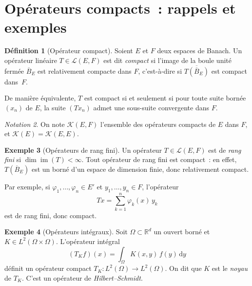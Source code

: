 \documentclass[a4paper,12pt]{book}
\DeclareMathOperator{\im}{im}
\newcommand{\R}{\mathbb{R}}
\newcommand{\dd}{\mathrm{d}}
\theoremstyle{definition}
\newtheorem{definition}{Définition}[chapter]
\newtheorem{exemple}[definition]{Exemple}
\theoremstyle{plain}
\theoremstyle{remark}
\newtheorem{notation}[definition]{Notation}
\begin{document}
\section{Opérateurs compacts~: rappels et exemples}

\begin{definition}[Opérateur compact]
\label{def:op-compact}
Soient $E$ et $F$ deux espaces de Banach. Un opérateur linéaire $T \in \mathcal{L}(E,F)$
est dit \emph{compact} si l'image de la boule unité
fermée $\overline{B}_E$ est relativement compacte dans $F$, c'est-à-dire si
$\overline{T(\overline{B}_E)}$ est compact dans~$F$.

De manière équivalente, $T$ est compact si et seulement si pour toute suite bornée
$(x_n)$ de $E$, la suite $(Tx_n)$ admet une sous-suite convergente dans $F$.
\end{definition}

\begin{notation}
On note $\mathcal{K}(E,F)$ l'ensemble des opérateurs
compacts de $E$ dans $F$, et $\mathcal{K}(E) = \mathcal{K}(E,E)$.
\end{notation}

\begin{exemple}[Opérateurs de rang fini]
\label{ex:rang-fini}
Un opérateur $T \in \mathcal{L}(E,F)$ est de \emph{rang fini} si $\dim \im(T) < \infty$.
Tout opérateur de rang fini est compact~: en effet, $T(\overline{B}_E)$ est un borné d'un
espace de dimension finie, donc relativement compact.

Par exemple, si $\varphi_1, \ldots, \varphi_n \in E'$ et $y_1, \ldots, y_n \in F$,
l'opérateur
\[
  Tx = \sum_{k=1}^n \varphi_k(x) \, y_k
\]
est de rang fini, donc compact.
\end{exemple}

\begin{exemple}[Opérateurs intégraux]
\label{ex:op-integral}
Soit $\Omega \subset \R^d$ un ouvert borné et $K \in L^2(\Omega \times \Omega)$.
L'opérateur intégral
\[
  (T_K f)(x) = \int_\Omega K(x,y)\, f(y) \, \dd y
\]
définit un opérateur compact $T_K : L^2(\Omega) \to L^2(\Omega)$. On dit que $K$ est le
\emph{noyau} de $T_K$. C'est un opérateur de \emph{Hilbert--Schmidt}.
\end{exemple}
\end{document}
